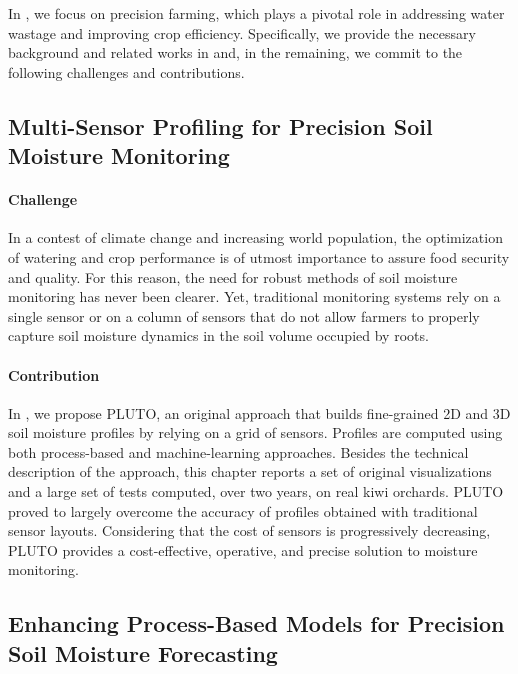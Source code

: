 In , we focus on precision farming, which plays a pivotal role in addressing water wastage and improving crop efficiency.
Specifically, we provide the necessary background and related works in  and, in the remaining, we commit to the following challenges and contributions.


\subsection*{Multi-Sensor Profiling for Precision Soil Moisture Monitoring}


\paragraph{Challenge}
In a contest of climate change and increasing world population, the optimization of watering and crop performance is of utmost importance to assure food security and quality.
For this reason, the need for robust methods of soil moisture monitoring has never been clearer.
Yet, traditional monitoring systems rely on a single sensor or on a column of sensors that do not allow farmers to properly capture soil moisture dynamics in the soil volume occupied by roots.


\paragraph{Contribution} In , we propose PLUTO, an original approach that builds fine-grained 2D and 3D soil moisture profiles by relying on a grid of sensors.
Profiles are computed using both process-based and machine-learning approaches.
Besides the technical description of the approach, this chapter reports a set of original visualizations and a large set of tests computed, over two years, on real kiwi orchards.
PLUTO proved to largely overcome the accuracy of profiles obtained with traditional sensor layouts.
Considering that the cost of sensors is progressively decreasing, PLUTO provides a cost-effective, operative, and precise solution to moisture monitoring.


\subsection*{Enhancing Process-Based Models for Precision Soil Moisture Forecasting}

